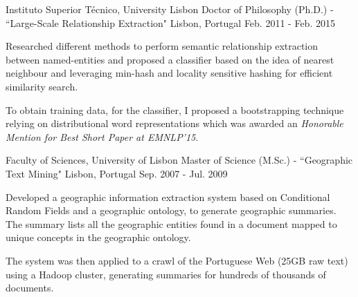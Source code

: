 

\begin{cventries}

  \cventry
    {Instituto Superior Técnico, University Lisbon} %
    {Doctor of Philosophy (Ph.D.) - ``Large-Scale Relationship Extraction"} %
    {Lisbon, Portugal} %
    {Feb. 2011 - Feb. 2015} %
    {
      \begin{cvitems} %
        \item {Researched different methods to perform semantic relationship extraction between named-entities and proposed a classifier based on the idea of nearest neighbour and leveraging min-hash and locality sensitive hashing for efficient similarity search.}
		\item {To obtain training data, for the classifier, I proposed a bootstrapping technique relying on distributional word representations which was awarded an {\it Honorable Mention for Best Short Paper at EMNLP'15}.}
      \end{cvitems}
    }


  \cventry
    {Faculty of Sciences, University of Lisbon} %
    {Master of Science (M.Sc.) - ``Geographic Text Mining"} %
    {Lisbon, Portugal} %
    {Sep. 2007 - Jul. 2009} %
    {
      \begin{cvitems} %
        \item {Developed a geographic information extraction system based on Conditional Random Fields and a geographic ontology, to generate geographic summaries. The summary lists all the geographic entities found in a document mapped to unique concepts in the geographic ontology.}
		\item {The system was then applied to a crawl of the Portuguese Web (25GB raw text) using a Hadoop cluster, generating summaries for hundreds of thousands of documents.}
      \end{cvitems}
    }


\end{cventries}
